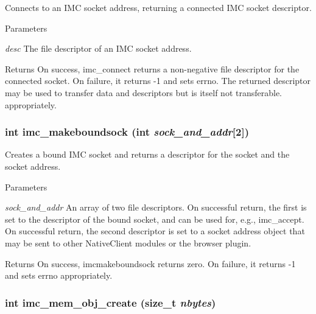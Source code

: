 \label{group__syscalls_ga8d0d3a853d9db5850b9996111a81455c}
Connects to an IMC socket address, returning a connected IMC socket descriptor. 
\begin{DoxyParams}{Parameters}
\item[{\em desc}]The file descriptor of an IMC socket address. \end{DoxyParams}
\begin{DoxyReturn}{Returns}
On success, imc\_\-connect returns a non-\/negative file descriptor for the connected socket. On failure, it returns -\/1 and sets errno. The returned descriptor may be used to transfer data and descriptors but is itself not transferable. appropriately. 
\end{DoxyReturn}
\hypertarget{group__syscalls_ga860564306c0be29e7894d9633f866ab8}{
\subsubsection[{imc\_\-makeboundsock}]{\setlength{\rightskip}{0pt plus 5cm}int imc\_\-makeboundsock (int {\em sock\_\-and\_\-addr}\mbox{[}2\mbox{]})}}
\label{group__syscalls_ga860564306c0be29e7894d9633f866ab8}
Creates a bound IMC socket and returns a descriptor for the socket and the socket address. 
\begin{DoxyParams}{Parameters}
\item[{\em sock\_\-and\_\-addr}]An array of two file descriptors. On successful return, the first is set to the descriptor of the bound socket, and can be used for, e.g., imc\_\-accept. On successful return, the second descriptor is set to a socket address object that may be sent to other NativeClient modules or the browser plugin. \end{DoxyParams}
\begin{DoxyReturn}{Returns}
On success, imcmakeboundsock returns zero. On failure, it returns -\/1 and sets errno appropriately. 
\end{DoxyReturn}
\hypertarget{group__syscalls_ga182a6da37d09ec51dcd181dd5a393fba}{
\subsubsection[{imc\_\-mem\_\-obj\_\-create}]{\setlength{\rightskip}{0pt plus 5cm}int imc\_\-mem\_\-obj\_\-create (size\_\-t {\em nbytes})}}
